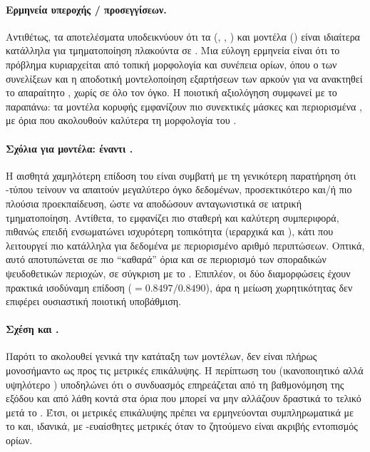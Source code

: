 \paragraph{Ερμηνεία υπεροχής / προσεγγίσεων.}
Αντιθέτως, τα αποτελέσματα υποδεικνύουν ότι τα  
(, , ) και 
μοντέλα () είναι ιδιαίτερα κατάλληλα για τμηματοποίηση πλακούντα
σε . Μια εύλογη ερμηνεία είναι ότι το πρόβλημα κυριαρχείται από
τοπική μορφολογία και συνέπεια ορίων, όπου ο  των συνελίξεων και 
η αποδοτική μοντελοποίηση εξαρτήσεων των  αρκούν για να
ανακτηθεί το απαραίτητο , χωρίς  σε όλο τον όγκο. Η ποιοτική
αξιολόγηση συμφωνεί με το παραπάνω: 
τα μοντέλα κορυφής εμφανίζουν πιο συνεκτικές
μάσκες και περιορισμένα , με όρια που ακολουθούν καλύτερα τη
μορφολογία του .

\paragraph{Σχόλια για  μοντέλα:  έναντι .}
Η αισθητά χαμηλότερη επίδοση του  είναι συμβατή με τη γενικότερη
παρατήρηση ότι -τύπου  τείνουν να απαιτούν μεγαλύτερο
όγκο δεδομένων, προσεκτικότερο  και/ή πιο πλούσια
προεκπαίδευση, ώστε να αποδώσουν ανταγωνιστικά σε ιατρική τμηματοποίηση.
Αντίθετα, το  εμφανίζει πιο σταθερή και καλύτερη συμπεριφορά,
πιθανώς επειδή ενσωματώνει ισχυρότερη τοπικότητα (ιεραρχικά  και
), κάτι που λειτουργεί πιο κατάλληλα για
 δεδομένα με περιορισμένο αριθμό περιπτώσεων. Οπτικά, αυτό αποτυπώνεται
σε πιο ``καθαρά'' όρια και σε περιορισμό των σποραδικών ψευδοθετικών περιοχών,
σε σύγκριση με το . Επιπλέον, οι δύο διαμορφώσεις
 έχουν πρακτικά ισοδύναμη επίδοση
($=0.8497/0.8490$), άρα η μείωση χωρητικότητας δεν επιφέρει ουσιαστική
ποιοτική υποβάθμιση.

\paragraph{Σχέση  και .}
Παρότι το  ακολουθεί γενικά την κατάταξη των μοντέλων, δεν
είναι πλήρως μονοσήμαντο ως προς τις μετρικές επικάλυψης. Η περίπτωση του
 (ικανοποιητικό  αλλά υψηλότερο ) υποδηλώνει ότι ο
συνδυα\-σμός  επηρεάζεται από τη βαθμονόμηση της εξόδου και από
λάθη κοντά στα όρια που μπορεί να μην αλλάζουν δραστικά το τελικό 
μετά το . Έτσι, οι μετρικές επικάλυψης πρέπει να ερμηνεύονται
συμπληρωματικά με το  και, ιδανικά, με -ευαίσθητες
μετρικές όταν το ζητούμενο είναι ακριβής εντοπισμός ορίων.

